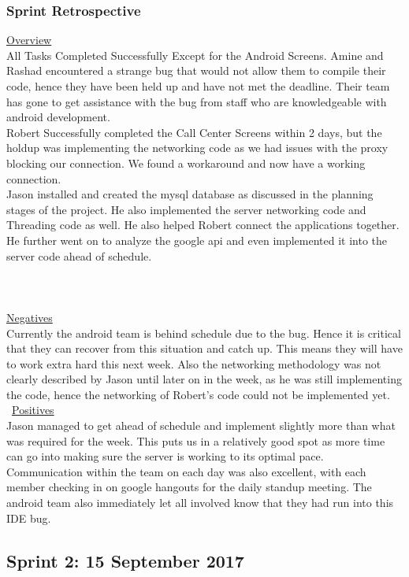 \documentclass[a4paper,12pt]{article}
\begin{document}
\subsubsection{Sprint Retrospective}
\underline{Overview}\\
All Tasks Completed Successfully Except for the Android Screens. Amine and Rashad encountered a strange bug that would not allow them to compile their code, hence they have been held up and have not met the deadline. Their team has gone to get assistance with the bug from staff who are knowledgeable with android development. \\ Robert Successfully completed the Call Center Screens within 2 days, but the holdup was implementing the networking code as we had issues with the proxy blocking our connection. We found a workaround and now have a working connection. \\ Jason installed and created the mysql database as discussed in the planning stages of the project. He also implemented the server networking code and Threading code as well. He also helped Robert connect the applications together. He further went on to analyze the google api and even implemented it into the server code ahead of schedule.\\\\\\\\
\underline{Negatives}\\
Currently the android team is behind schedule due to the bug. Hence it is critical that they can recover from this situation and catch up. This means they will have to work extra hard this next week. Also the networking methodology was not clearly described by Jason until later on in the week, as he was still implementing the code, hence the networking of Robert's code could not be implemented yet. \\\
\underline{Positives}\\
Jason managed to get ahead of schedule and implement slightly more than what was required for the week. This puts us in a relatively good spot as more time can go into making sure the server is working to its optimal pace. Communication within the team on each day was also excellent, with each member checking in on google hangouts for the daily standup meeting. The android team also immediately let all involved know that they had run into this IDE bug. 

\newpage

\subsection{Sprint 2: 15 September 2017}
\end{document}
